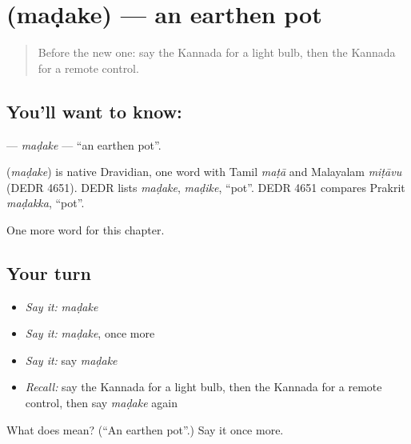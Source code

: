 \section[\texorpdfstring{\kn{ಮಡಕೆ} (maḍake)}{ಮಡಕೆ (maḍake)}]{ (maḍake) — an earthen pot}

\label{lesson:KA-C266-madake}



\begin{quote}
Before the new one: say the Kannada for a light bulb, then the Kannada for a remote control.
\end{quote}

\subsection*{You'll want to know: }
\textbf{} — \emph{maḍake} — \textquotedblleft{}an earthen pot\textquotedblright{}.

\begin{cousinweb}
\textbf{} (\emph{maḍake}) is native Dravidian, one word with Tamil \emph{maṭā} and Malayalam \emph{miṭāvu} (DEDR 4651). DEDR lists \emph{maḍake}, \emph{maḍike}, \textquotedblleft{}pot\textquotedblright{}. DEDR 4651 compares Prakrit \emph{maḍakka}, \textquotedblleft{}pot\textquotedblright{}.
\end{cousinweb}

\begin{grammarlens}[title={What you've built}]
One more word for this chapter.
\end{grammarlens}

\subsection*{Your turn}
\begin{itemize}
\raggedright
  \item \emph{Say it:} \emph{maḍake}
  \item \emph{Say it:} \emph{maḍake}, once more
  \item \emph{Say it:} say \emph{maḍake}
  \item \emph{Recall:} say the Kannada for a light bulb, then the Kannada for a remote control, then say \emph{maḍake} again
\end{itemize}

\begin{tcolorbox}[breakable,colback=teal!4,colframe=teal!35!black,title={Before you move on}]
What does  mean? (\textquotedblleft{}An earthen pot\textquotedblright{}.) Say it once more.
\end{tcolorbox}
